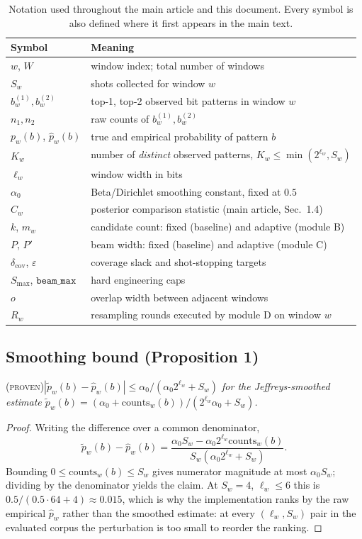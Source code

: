 \documentclass[preprint,11pt]{elsarticle}
\newcommand{\PROVEN}{\textsc{(proven)}}
\newcommand{\Cw}{C_w}
\newcommand{\dcov}{\delta_{\mathrm{cov}}}
\newcommand{\Smax}{S_{\max}}
\newcommand{\beammax}{\texttt{beam\_max}}
\begin{document}
\begin{table}[h]
\centering\small
\caption{Notation used throughout the main article and this document. Every symbol is also defined where it first appears in the main text.}
\label{tab:notation}
\begin{tabular}{@{}ll@{}}
\toprule
Symbol & Meaning \\
\midrule
$w$, $W$ & window index; total number of windows \\
$S_w$ & shots collected for window $w$ \\
$b^{(1)}_w, b^{(2)}_w$ & top-1, top-2 observed bit patterns in window $w$ \\
$n_1, n_2$ & raw counts of $b^{(1)}_w, b^{(2)}_w$ \\
$p_w(b)$, $\hat p_w(b)$ & true and empirical probability of pattern $b$ \\
$K_w$ & number of \emph{distinct} observed patterns, $K_w\le\min(2^{\ell_w},S_w)$ \\
$\ell_w$ & window width in bits \\
$\alpha_0$ & Beta/Dirichlet smoothing constant, fixed at $0.5$ \\
$\Cw$ & posterior comparison statistic (main article, Sec.~1.4) \\
$k$, $m_w$ & candidate count: fixed (baseline) and adaptive (module B) \\
$P$, $P'$ & beam width: fixed (baseline) and adaptive (module C) \\
$\dcov$, $\varepsilon$ & coverage slack and shot-stopping targets \\
$\Smax$, $\beammax$ & hard engineering caps \\
$o$ & overlap width between adjacent windows \\
$R_w$ & resampling rounds executed by module D on window $w$ \\
\bottomrule
\end{tabular}
\end{table}

\subsection{Smoothing bound (Proposition 1)}
\PROVEN{}\quad\textit{$|\tilde p_w(b)-\hat p_w(b)|\le\alpha_0/(\alpha_0 2^{\ell_w}+S_w)$
for the Jeffreys-smoothed estimate
$\tilde p_w(b)=(\alpha_0+\mathrm{counts}_w(b))/(2^{\ell_w}\alpha_0+S_w)$.}

\begin{proof}
Writing the difference over a common denominator,
\[
\tilde p_w(b)-\hat p_w(b)=\frac{\alpha_0 S_w-\alpha_0 2^{\ell_w}\mathrm{counts}_w(b)}{S_w(\alpha_0 2^{\ell_w}+S_w)} .
\]
Bounding $0\le\mathrm{counts}_w(b)\le S_w$ gives numerator magnitude at
most $\alpha_0 S_w$; dividing by the denominator yields the claim. At
$S_w=4$, $\ell_w\le6$ this is $0.5/(0.5\cdot64+4)\approx0.015$, which is
why the implementation ranks by the raw empirical $\hat p_w$ rather than
the smoothed estimate: at every $(\ell_w,S_w)$ pair in the evaluated
corpus the perturbation is too small to reorder the ranking.
\end{proof}
\end{document}
